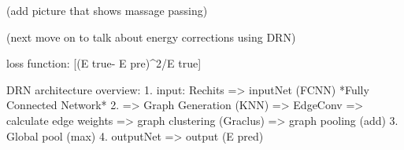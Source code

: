 (add picture that shows massage passing)


(next move on to talk about energy corrections using DRN)






loss function:  [(E true- E pre)^2/E true] %




DRN architecture overview:
1. input: Rechits => inputNet (FCNN) *Fully Connected Network*
2. => Graph Generation (KNN) => EdgeConv => calculate edge weights => graph clustering (Graclus) => graph pooling (add)
3. Global pool (max)
4. outputNet => output (E pred)

